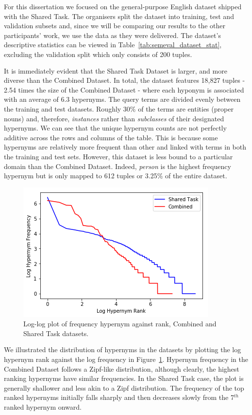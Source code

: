 For this dissertation we focused on the general-purpose English dataset shipped with the Shared Task.  The organisers split the dataset into training, test and validation subsets and, since we will be comparing our results to the other participants' work, we use the data as they were delivered.  The dataset's descriptive statistics can be viewed in Table~\ref{tab:semeval_dataset_stat}, excluding the validation split which only consists of 200 tuples.

It is immediately evident that the Shared Task Dataset is larger, and more diverse than the Combined Dataset.  In total, the dataset features 18,827 tuples - 2.54 times the size of the Combined Dataset - where each hyponym is associated with an average of 6.3 hypernyms.  The query terms are divided evenly between the training and test datasets.  Roughly 30\% of the terms are entities (proper nouns) and, therefore, \textit{instances} rather than \textit{subclasses} of their designated hypernyms.  We can see that the unique hypernym counts are not perfectly additive across the rows and columns of the table.  This is because some hypernyms are relatively more frequent than other and linked with terms in both the training and test sets.  However, this dataset is less bound to a particular domain than the Combined Dataset.  Indeed, \textit{person} is the highest frequency hypernym but is only mapped to 612 tuples or 3.25\% of the entire dataset.
\begin{figure}[ht!] 
  \centering
  \includegraphics[width=0.6\linewidth]{images/both_hyper_freq_zipf.png}
  \caption{Log-log plot of frequency hypernym against rank, Combined and Shared Task datasets.}
  \label{fig:dataset_hypernym_freq}
\end{figure}
We illustrated the distribution of hypernyms in the datasets by plotting the log hypernym rank against the log frequency in Figure~\ref{fig:dataset_hypernym_freq}.  Hypernym frequency in the Combined Dataset follows a Zipf-like distribution, although clearly, the highest ranking hypernyms have similar frequencies.  In the Shared Task case,  the plot is generally shallower and less akin to a Zipf distribution.  The frequency of the top ranked hypernyms initially falls sharply and then decreases slowly from the 7$^{th}$ ranked hypernym onward.

